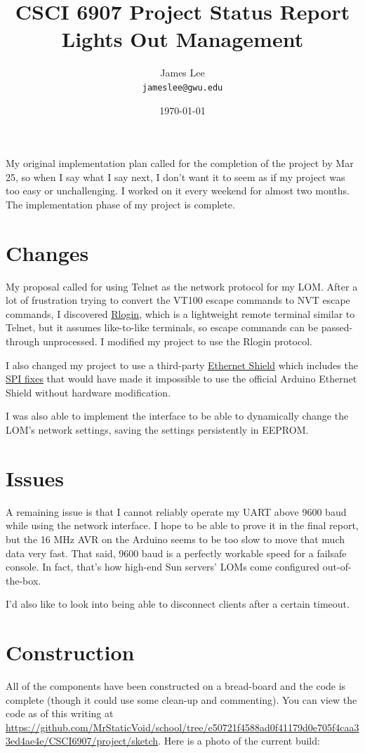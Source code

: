 \documentclass{amsart}
\title{CSCI 6907 Project Status Report\\
Lights Out Management}
\author{James Lee\\
\texttt{jameslee@gwu.edu}}
\date{\today}
\begin{document}
\maketitle

My original implementation plan called for the completion of the project by Mar 25, so when I say what I say next, I don't want it to seem as if my project was too easy or unchallenging.  I worked on it every weekend for almost two months.  The implementation phase of my project is complete.

\section{Changes}
My proposal called for using Telnet as the network protocol for my LOM.  After a lot of frustration trying to convert the VT100 escape commands to NVT escape commands, I discovered \href{http://www.ietf.org/rfc/rfc1282.txt}{Rlogin}, which is a lightweight remote terminal similar to Telnet, but it assumes like-to-like terminals, so escape commands can be passed-through unprocessed.  I modified my project to use the Rlogin protocol.

I also changed my project to use a third-party \href{http://www.freetronics.com/products/ethernet-shield-with-poe}{Ethernet Shield} which includes the \href{http://www.wiznet.co.kr/UpLoad\_Files/ReferenceFiles/W5100\_AN\_SPI.pdf}{SPI fixes} that would have made it impossible to use the official Arduino Ethernet Shield without hardware modification.

I was also able to implement the interface to be able to dynamically change the LOM's network settings, saving the settings persistently in EEPROM.

\section{Issues}
A remaining issue is that I cannot reliably operate my UART above 9600 baud while using the network interface.  I hope to be able to prove it in the final report, but the 16 MHz AVR on the Arduino seems to be too slow to move that much data very fast.  That said, 9600 baud is a perfectly workable speed for a failsafe console.  In fact, that's how high-end Sun servers' LOMs come configured out-of-the-box.

I'd also like to look into being able to disconnect clients after a certain timeout.

\section{Construction}
All of the components have been constructed on a bread-board and the code is complete (though it could use some clean-up and commenting).  You can view the code as of this writing at \url{https://github.com/MrStaticVoid/school/tree/e50721f4588ad0f41179d0e705f4caa33ed4ae4e/CSCI6907/project/sketch}.  Here is a photo of the current build:
\end{document}
